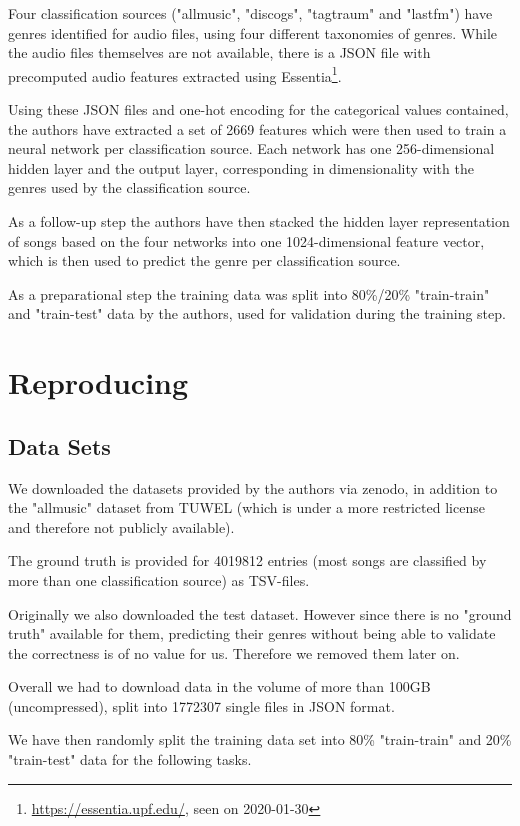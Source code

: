 \documentclass[sigconf,nonacm]{acmart}
\begin{document}
Four classification sources ("allmusic", "discogs", "tagtraum" and "lastfm")
have genres identified for audio files, using four different taxonomies
of genres.
While the audio files themselves are not available, there is a JSON
file with precomputed audio features extracted using 
Essentia\footnote{\url{https://essentia.upf.edu/}, seen on 2020-01-30}.

Using these JSON files and one-hot encoding for the categorical
values contained,
the authors have extracted a set of 2669 features which were
then used to train a neural network per classification source.
Each network has one 256-dimensional hidden layer and the output layer,
corresponding in dimensionality with the genres used by the classification
source. 

As a follow-up step the authors have then stacked the hidden
layer representation of songs based on the four networks into
one 1024-dimensional feature vector, which is then used to predict
the genre per classification source.

As a preparational step the training data was split into 80\%/20\%
"train-train" and "train-test" data by the authors,
used for validation during the training step.

\section{Reproducing}

\subsection{Data Sets}

We downloaded the datasets provided by the authors via zenodo,
in addition to the "allmusic" dataset from TUWEL
(which is under a more restricted license and therefore not
publicly available).

The ground truth is provided for 4019812 entries (most songs are
classified by more than one classification source) as TSV-files.

Originally we also downloaded the test dataset.
However since there is no "ground truth" available for them, predicting
their genres without being able to validate the correctness is of
no value for us.
Therefore we removed them later on.

Overall we had to download data in the volume of
more than 100GB (uncompressed),
split into 1772307 single files in JSON format.

We have then randomly split the training data set into 80\%
"train-train" and 20\% "train-test" data for the following tasks.
\end{document}
